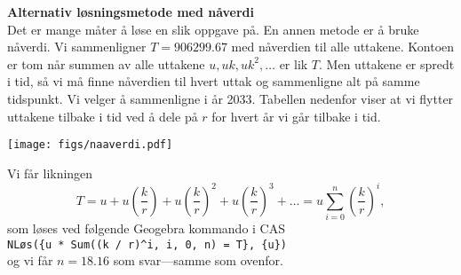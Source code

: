 	\textbf{Alternativ løsningsmetode med nåverdi} \\
	Det er mange måter å løse en slik oppgave på.
	En annen metode er å bruke nåverdi.
	Vi sammenligner $T = 906299.67$ med nåverdien til alle uttakene.
	Kontoen er tom når summen av alle uttakene $u, uk, uk^2, \dots$ er lik $T$.
	Men uttakene er spredt i tid, så vi må finne nåverdien til hvert uttak og sammenligne alt på samme tidspunkt. 
	Vi velger å sammenligne i år 2033.
	Tabellen nedenfor viser at vi flytter uttakene tilbake i tid ved å dele på $r$ for hvert år vi går tilbake i tid.
	\begin{center}
		\texttt{[image: figs/naaverdi.pdf]}
	\end{center}
	Vi får likningen
	\begin{equation*}
		T = u + u\left( \frac{k}{r} \right) + u\left( \frac{k}{r} \right)^2 + u\left( \frac{k}{r} \right)^3 + \dots = u \sum_{i=0}^{n} \left( \frac{k}{r} \right)^i,
	\end{equation*}
	\noindent som løses ved følgende Geogebra kommando i CAS \\
	\verb|NLøs({u * Sum((k / r)^i, i, 0, n) = T}, {u})| \\
	og vi får $n = 18.16$ som svar---samme som ovenfor.


